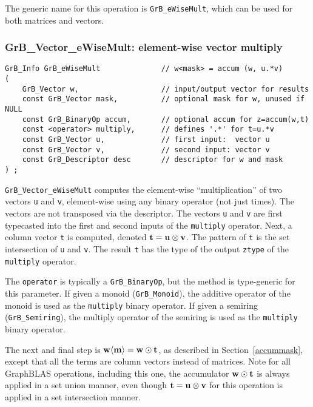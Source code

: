 \documentclass[12pt]{article}
\begin{document}
{The generic name for this operation is \verb'GrB_eWiseMult', which can be used
for both matrices and vectors.

\newpage
\subsubsection{{\sf GrB\_Vector\_eWiseMult:} element-wise vector multiply}
\label{eWiseMult_vector}

\begin{mdframed}[userdefinedwidth=6in]
{\footnotesize
\begin{verbatim}
GrB_Info GrB_eWiseMult              // w<mask> = accum (w, u.*v)
(
    GrB_Vector w,                   // input/output vector for results
    const GrB_Vector mask,          // optional mask for w, unused if NULL
    const GrB_BinaryOp accum,       // optional accum for z=accum(w,t)
    const <operator> multiply,      // defines '.*' for t=u.*v
    const GrB_Vector u,             // first input:  vector u
    const GrB_Vector v,             // second input: vector v
    const GrB_Descriptor desc       // descriptor for w and mask
) ;
\end{verbatim}
} \end{mdframed}

\verb'GrB_Vector_eWiseMult' computes the element-wise ``multiplication'' of two
vectors \verb'u' and \verb'v', element-wise using any binary operator (not just
times).  The vectors are not transposed via the descriptor.  The vectors
\verb'u' and \verb'v' are first typecasted into the first and second inputs of
the \verb'multiply' operator.  Next, a column vector \verb't' is computed,
denoted ${\bf t = u \otimes v}$.  The pattern of \verb't' is the set
intersection of \verb'u' and \verb'v'.  The result \verb't' has the type of the
output \verb'ztype' of the \verb'multiply' operator.

The \verb'operator' is typically a \verb'GrB_BinaryOp', but the method is
type-generic for this parameter.  If given a monoid (\verb'GrB_Monoid'), the
additive operator of the monoid is used as the \verb'multiply' binary operator.
If given a semiring (\verb'GrB_Semiring'), the multiply operator of the
semiring is used as the \verb'multiply' binary operator.

The next and final step is ${\bf w \langle m \rangle  = w \odot t}$, as
described in Section~\ref{accummask}, except that all the terms are column
vectors instead of matrices.  Note for all GraphBLAS operations, including this
one, the accumulator ${\bf w \odot t}$ is always applied in a set union manner,
even though ${\bf t = u \otimes v}$ for this operation is applied in a set
intersection manner.

}
\end{document}
